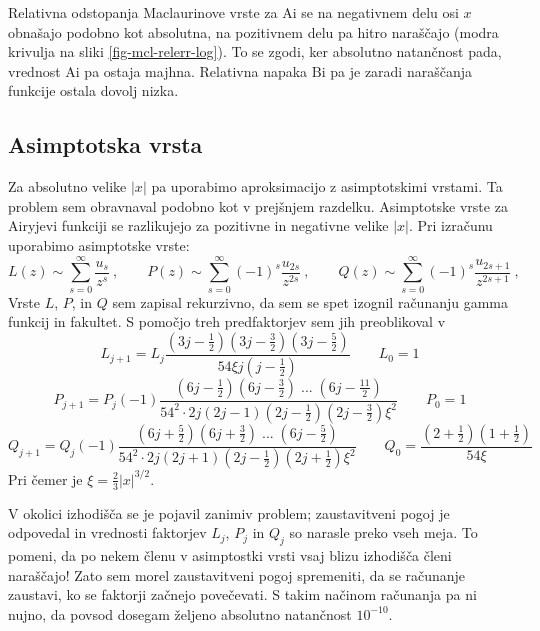 \documentclass[a4paper, 12pt, slovene]{article}
\newcommand{\Ai}{\mathrm{Ai}}
\newcommand{\Bi}{\mathrm{Bi}}
\begin{document}
Relativna odstopanja Maclaurinove vrste za $\Ai$ se na negativnem delu osi $x$ obnašajo podobno kot absolutna, na pozitivnem delu pa hitro naraščajo (modra krivulja na sliki \ref{fig-mcl-relerr-log}). To se zgodi, ker absolutno natančnost pada, vrednost $\Ai$ pa ostaja majhna. Relativna napaka $\Bi$ pa je zaradi naraščanja funkcije ostala dovolj nizka.


\subsection{Asimptotska vrsta}
Za absolutno velike $|x|$ pa uporabimo aproksimacijo z asimptotskimi vrstami. Ta problem sem obravnaval podobno kot v prejšnjem razdelku. Asimptotske vrste za Airyjevi funkciji se razlikujejo za pozitivne in negativne velike $|x|$. Pri izračunu uporabimo asimptotske vrste:
\begin{equation*}
  L(z) \sim \sum_{s=0}^\infty \frac{u_s}{z^s}\>,\qquad
  P(z) \sim \sum_{s=0}^\infty (-1)^s \frac{u_{2s}}{z^{2 s}}\>,\qquad
  Q(z) \sim \sum_{s=0}^\infty (-1)^s \frac{u_{2s+1}}{z^{2 s+1}}\>,
\end{equation*}
Vrste $L$, $P$, in $Q$ sem zapisal rekurzivno, da sem se spet izognil računanju gamma funkcij in fakultet. S pomočjo treh predfaktorjev sem jih preoblikoval v
\begin{equation}
L_{j+1} = L_j \frac{(3j-\frac{1}{2})(3j-\frac{3}{2})(3j-\frac{5}{2})}{54\xi j (j-\frac{1}{2})} \qquad L_0 = 1
\end{equation}
\begin{equation}
P_{j+1} = P_j(-1)\frac{(6j-\frac{1}{2})(6j-\frac{3}{2})\;...\;(6j-\frac{11}{2})}{54^2\cdot 2j(2j-1)(2j-\frac{1}{2})(2j-\frac{3}{2})\xi^2} \qquad P_0 = 1
\end{equation}
\begin{equation}
Q_{j+1} = Q_j(-1)\frac{(6j+\frac{5}{2})(6j+\frac{3}{2})\;...\;(6j-\frac{5}{2})}{54^2\cdot 2j(2j+1)(2j-\frac{1}{2})(2j+\frac{1}{2})\xi^2} \qquad Q_0 = \frac{(2+\frac{1}{2})(1+\frac{1}{2})}{54\xi}
\end{equation}
Pri čemer je $\xi=\frac{2}{3} |x|^{3/2}$. \par\vspace{5mm}

V okolici izhodišča se je pojavil zanimiv problem; zaustavitveni pogoj je odpovedal in vrednosti faktorjev $L_j$, $P_j$ in $Q_j$ so narasle preko vseh meja. To pomeni, da po nekem členu v asimptostki vrsti vsaj blizu izhodišča členi naraščajo! Zato sem morel zaustavitveni pogoj spremeniti, da se računanje zaustavi, ko se faktorji začnejo povečevati. S takim načinom računanja pa ni nujno, da povsod dosegam željeno absolutno natančnost $10^{-10}$. \par\vspace{5mm}
\end{document}
